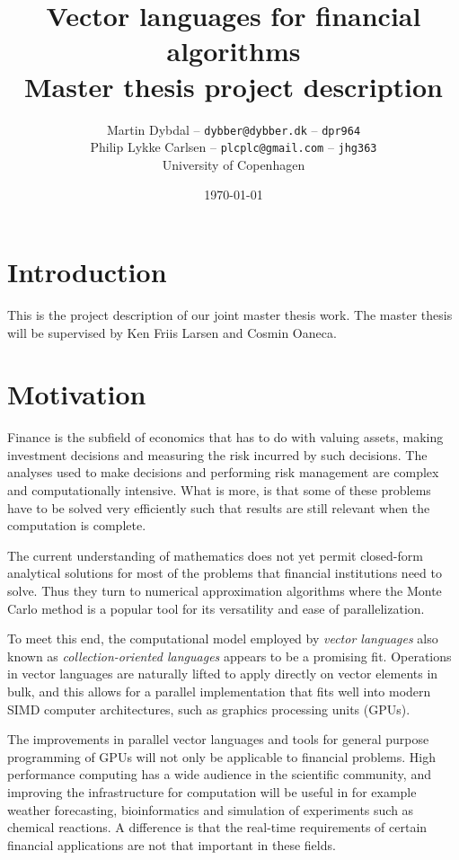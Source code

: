 \documentclass[10pt,a4paper,final,oneside,openany,article]{memoir}
\title{Vector languages for financial algorithms \\
      \small{Master thesis project description}
}
\author{
  Martin Dybdal -- \texttt{dybber@dybber.dk} -- \texttt{dpr964} \\
  Philip Lykke Carlsen -- \texttt{plcplc@gmail.com} -- \texttt{jhg363}
\\
University of Copenhagen}
\date{\today}
\begin{document}
\maketitle

\chapter{Introduction}
This is the project description of our joint master thesis work. The
master thesis will be supervised by Ken Friis Larsen and Cosmin
Oaneca.

\chapter{Motivation}
Finance is the subfield of economics that has to do with valuing
assets, making investment decisions and measuring the risk incurred by
such decisions. The analyses used to make decisions and performing
risk management are complex and computationally intensive. What is
more, is that some of these problems have to be solved very
efficiently such that results are still relevant when the computation
is complete.

The current understanding of mathematics does not yet permit
closed-form analytical solutions for most of the problems that
financial institutions need to solve. Thus they turn to numerical
approximation algorithms where the Monte Carlo method is a popular
tool for its versatility and ease of parallelization.

To meet this end, the computational model employed by \textit{vector
  languages} also known as \textit{collection-oriented languages}
\cite{blelloch1990vector} appears to be a promising fit. Operations in
vector languages are naturally lifted to apply directly on vector
elements in bulk, and this allows for a parallel implementation that
fits well into modern SIMD computer architectures, such as graphics
processing units (GPUs).

The improvements in parallel vector languages and tools for general
purpose programming of GPUs will not only be applicable to financial
problems. High performance computing has a wide audience in the
scientific community, and improving the infrastructure for computation
will be useful in for example weather forecasting, bioinformatics and
simulation of experiments such as chemical reactions. A difference is
that the real-time requirements of certain financial applications are
not that important in these fields.
\end{document}
